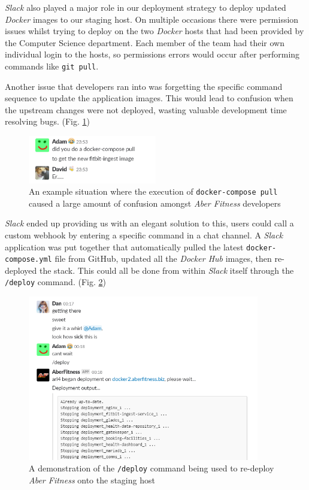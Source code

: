 \textit{Slack} also played a major role in our deployment strategy to deploy updated \textit{Docker} images to our staging host. On multiple occasions there were permission issues whilst trying to deploy on the two \textit{Docker} hosts that had been provided by the Computer Science department. Each member of the team had their own individual login to the hosts, so permissions errors would occur after performing commands like \lstinline{git pull}.

Another issue that developers ran into was forgetting the specific command sequence to update the application images. This would lead to confusion when the upstream changes were not deployed, wasting valuable development time resolving bugs. (Fig. \ref{fig:david_being_a_dumbass})

\begin{figure}[H]
    \centering
    \includegraphics[width=0.5\textwidth]{Images/aberfitness_slack_bot_reason_why.png}
    \caption{An example situation where the execution of \lstinline{docker-compose pull} caused a large amount of confusion amongst \textit{Aber Fitness} developers}
    \label{fig:david_being_a_dumbass}
\end{figure}

\textit{Slack} ended up providing us with an elegant solution to this, users could call a custom webhook by entering a specific command in a chat channel. A \textit{Slack} application was put together that automatically pulled the latest \lstinline{docker-compose.yml} file from GitHub, updated all the \textit{Docker Hub} images, then re-deployed the stack. This could all be done from within \textit{Slack} itself through the \lstinline{/deploy} command. (Fig. \ref{fig:slack_bot})

\begin{figure}[H]
    \centering
    \includegraphics[width=0.9\textwidth]{Images/aberfitness_slack_bot.png}
    \caption{A demonstration of the \lstinline{/deploy} command being used to re-deploy \textit{Aber Fitness} onto the staging host}
    \label{fig:slack_bot}
\end{figure}
